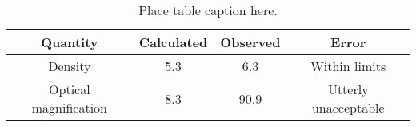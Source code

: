 \documentclass[12pt]{article}
\begin{document}
\clearpage

\begin{table}
\begin{tabular}{|c|c|c|c|}\hline
\textbf{Quantity} & \textbf{Calculated} & \textbf{Observed} & \textbf{Error} \\ \hline
  Density & 5.3 & 6.3 & Within limits \\ \hline
  Optical magnification & 8.3 & 90.9 & Utterly unacceptable\! \\ \hline
\end{tabular}
\caption{\label{tbl1} Place table caption here.}
\end{table}
\end{document}
